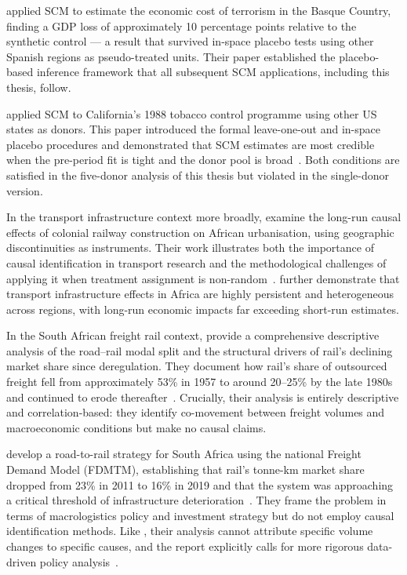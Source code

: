 \textcite{abadie2003} applied SCM to estimate the economic cost of
terrorism in the Basque Country, finding a GDP loss of approximately
10 percentage points relative to the synthetic control --- a result
that survived in-space placebo tests using other Spanish regions as
pseudo-treated units.
Their paper established the placebo-based inference framework that
all subsequent SCM applications, including this thesis, follow.

\textcite{abadie2010} applied SCM to California's 1988 tobacco
control programme using other US states as donors.
This paper introduced the formal leave-one-out and in-space placebo
procedures and demonstrated that SCM estimates are most credible when
the pre-period fit is tight and the donor pool is
broad~\parencite{abadie2010}.
Both conditions are satisfied in the five-donor analysis of this
thesis but violated in the single-donor version.

In the transport infrastructure context more broadly,
\textcite{jedwab2016} examine the long-run causal effects of colonial
railway construction on African urbanisation, using geographic
discontinuities as instruments.
Their work illustrates both the importance of causal identification
in transport research and the methodological challenges of applying
it when treatment assignment is non-random~\parencite{jedwab2016}.
\textcite{jedwab2016} further demonstrate that transport
infrastructure effects in Africa are highly persistent and
heterogeneous across regions, with long-run economic impacts
far exceeding short-run estimates.

In the South African freight rail context, \textcite{stander2005}
provide a comprehensive descriptive analysis of the road--rail modal
split and the structural drivers of rail's declining market share
since deregulation.
They document how rail's share of outsourced freight fell from
approximately 53\% in 1957 to around 20--25\% by the late 1980s
and continued to erode thereafter~\parencite{stander2005}.
Crucially, their analysis is entirely descriptive and
correlation-based: they identify co-movement between freight volumes
and macroeconomic conditions but make no causal claims.

\textcite{havenga2021} develop a road-to-rail strategy for South
Africa using the national Freight Demand Model (FDMTM), establishing
that rail's tonne-km market share dropped from 23\% in 2011 to 16\%
in 2019 and that the system was approaching a critical threshold of
infrastructure deterioration~\parencite{havenga2021}.
They frame the problem in terms of macrologistics policy and
investment strategy but do not employ causal identification methods.
Like \textcite{stander2005}, their analysis cannot attribute specific
volume changes to specific causes, and the report explicitly calls
for more rigorous data-driven policy analysis~\parencite{havenga2021}.

